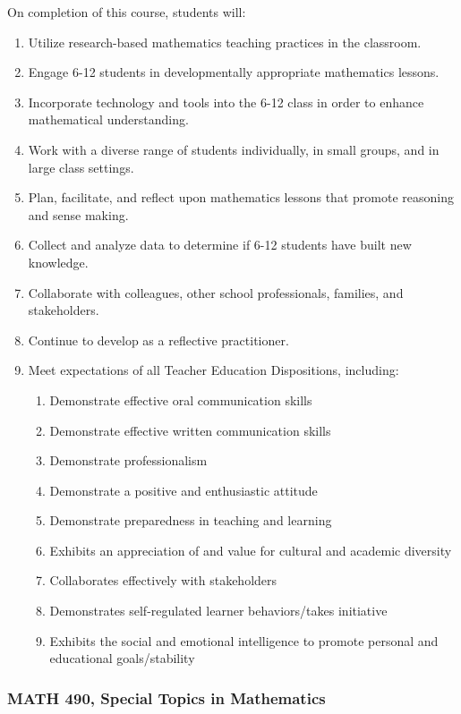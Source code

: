 \documentclass[11pt]{article}
\newenvironment{alphalist}{
\begin{enumerate}[label=(\arabic*),widest=107 ,leftmargin=25pt, itemsep=0pt]}
{\end{enumerate}}
\newenvironment{betalist}{
\begin{enumerate}[label=(\alph*),widest=zzz,leftmargin=35pt,itemsep=0pt]}
{\end{enumerate}}
\begin{document}
On completion of this course, students will:
\begin{alphalist}
\item Utilize research-based mathematics teaching practices in the classroom.
\item Engage 6-12 students in developmentally appropriate mathematics lessons.
\item Incorporate technology and tools into the 6-12 class in order to enhance mathematical understanding.
\item Work with a diverse range of students individually, in small groups, and in large class settings.
\item Plan, facilitate, and reflect upon mathematics lessons that promote reasoning and sense making.
\item Collect and analyze data to determine if 6-12 students have built new knowledge. 
\item Collaborate with colleagues, other school professionals, families, and stakeholders.
\item Continue to develop as a reflective practitioner.
\item Meet expectations of all Teacher Education Dispositions, including:
\begin{betalist}
\item Demonstrate effective oral communication skills
\item Demonstrate effective written communication skills
\item Demonstrate professionalism
\item Demonstrate a positive and enthusiastic attitude
\item Demonstrate preparedness in teaching and learning
\item Exhibits an appreciation of and value for cultural and academic diversity
\item Collaborates effectively with stakeholders
\item Demonstrates self-regulated learner behaviors/takes initiative
\item Exhibits the social and emotional intelligence to promote personal and educational goals/stability
\end{betalist}
\end{alphalist}

\subsubsection*{MATH 490, Special Topics in Mathematics}
\end{document}
